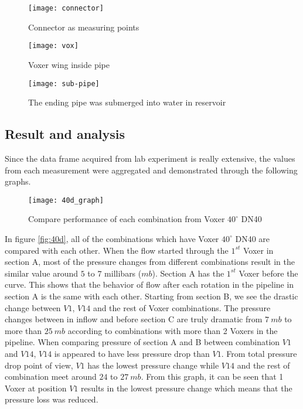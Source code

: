 \begin{figure}[!htb]
   \begin{minipage}{0.48\textwidth}
     \centering
     \texttt{[image: connector]}
     \caption{Connector as measuring points}\label{fig:connector}
   \end{minipage}\hfill
   \begin {minipage}{0.48\textwidth}
     \centering
     \texttt{[image: vox]}
     \caption{Voxer wing inside pipe}\label{fig:vox}
   \end{minipage}
\end{figure}


\begin{figure}[h]
  \centering
  \texttt{[image: sub-pipe]}
  \caption{ The ending pipe was submerged into water in reservoir}
  \label{fig:subpipe}
\end{figure}
\newpage

\subsection{Result and analysis}

Since the data frame acquired from lab experiment is really extensive, the values from each measurement were aggregated and demonstrated through the following graphs.

\begin{figure}[h!]
  \centering
  \texttt{[image: 40d\_graph]}
  \caption{ Compare performance of each combination from Voxer $40^{\circ}$ DN40}
  \label{fig:40d}
\end{figure}

In figure \vref{fig:40d}, all of the combinations which have Voxer $40^{\circ}$ DN40 are compared with each other. When the flow started through the $1^{st}$ Voxer in section A, most of the pressure changes from different combinations result in the similar value around $5$ to $7$ millibars ($mb$). Section A has the $1^{st}$ Voxer before the curve. This shows that the behavior of flow after each rotation in the pipeline in section A is the same with each other. Starting from section B, we see the drastic change between $V1$, $V14$ and the rest of Voxer combinations. The pressure changes between in inflow and before section C are truly dramatic from $7\ mb$ to more than $25\ mb$ according to combinations with more than 2 Voxers in the pipeline. When comparing pressure of section A and B between combination $V1$ and $V14$, $V14$ is appeared to have less pressure drop than $V1$. From total pressure drop point of view, $V1$ has the lowest pressure change while $V14$ and the rest of combination meet around $24$ to $27\ mb$. From this graph, it can be seen that 1 Voxer at position $V1$ results in the lowest pressure change which means that the pressure loss was reduced. 
\newpage

